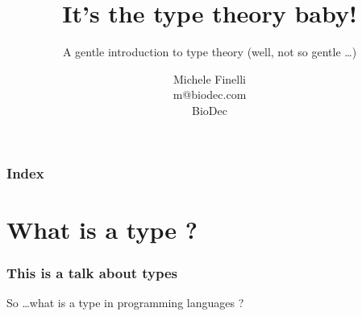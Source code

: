 \documentclass{beamer}
\title[Type theory] %
{ It's the type theory baby! }
\subtitle{A gentle introduction to type theory (well, not so gentle
\dots)}
\author[Michele Finelli] %
{Michele Finelli\\
m@biodec.com\\
BioDec}
\date{}
\begin{document}
\begin{frame}
  \titlepage
\end{frame}

\begin{frame}
  \frametitle{Index}
  \tableofcontents
\end{frame}

\section{What is a type ?} %
\label{sec:What is a type ?}

\begin{frame}

    \frametitle{This is a talk about types}

    So \dots what is a type in programming languages ?

    \begin{enumerate}
    
        
        
    
    \end{enumerate}

\end{frame}
\end{document}
